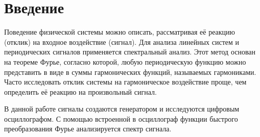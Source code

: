 \section*{Введение}

Поведение физической системы можно описать, рассматривая её реакцию (отклик) на входное воздействие (сигнал). Для анализа линейных систем и периодических сигналов применяется спектральный анализ. Этот метод основан на теореме Фурье, согласно которой, любую периодическую функцию можно представить в виде в суммы гармонических функций, называемых гармониками. Часто исследовать отклик системы на гармоническое воздействие проще, чем определить её реакцию на произвольный сигнал. 

В данной работе сигналы создаются генератором и исследуются цифровым осциллографом. С помощью встроенной в осциллограф функции быстрого преобразования Фурье анализируется спектр сигнала.